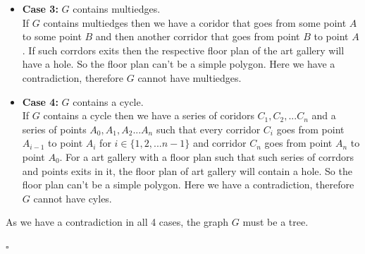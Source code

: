 \documentclass[addpoints,a4paper]{exam}
\begin{document}
\begin{questions}
\begin{solution}
\begin{parts}
\begin{itemize}
				\item \textbf{Case 3:} $G$ contains multiedges.
				      \\If $G$ contains multiedges then we have a coridor that goes from some point $A$ to some point $B$ and then another corridor that goes from point $B$ to point $A$. If such corrdors exits then the respective floor plan of the art gallery will have a hole.
				      So the floor plan can't be a simple polygon. Here we have a contradiction, therefore $G$ cannot have multiedges.
				\item \textbf{Case 4:} $G$ contains a cycle.
				      \\If $G$ contains a cycle then we have a series of coridors $C_1, C_2, ... C_n$  and a series of points $A_0, A_1, A_2... A_n$ such that every corridor $C_i$ goes from point $A_{i-1}$ to point $A_i$ for $i \in \{1,2,...n-1\}$ and corridor $C_n$ goes from point $A_n$ to point $A_0$.
				      For a art gallery with a floor plan such that such series of corrdors and points exits in it, the floor plan of art gallery will contain a hole.
				      So the floor plan can't be a simple polygon. Here we have a contradiction, therefore $G$ cannot have cyles.
				      
			\end{itemize}
			As we have a contradiction in all 4 cases, the graph $G$ must be a tree.
			\begin{flushright}
				$\square$
			\end{flushright}
			

\end{parts}
\end{solution}
\end{questions}
\end{document}
